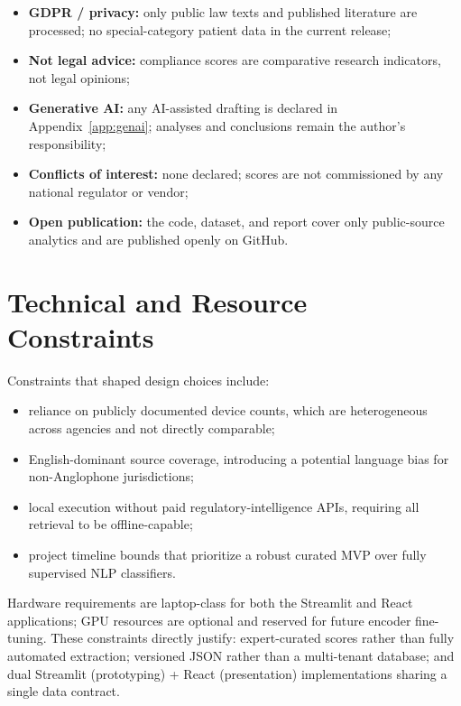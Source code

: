 \begin{itemize}[noitemsep]
  \item \textbf{GDPR / privacy:} only public law texts and published literature are
        processed; no special-category patient data in the current release;
  \item \textbf{Not legal advice:} compliance scores are comparative research
        indicators, not legal opinions;
  \item \textbf{Generative AI:} any AI-assisted drafting is declared in
        Appendix~\ref{app:genai}; analyses and conclusions remain the author's
        responsibility;
  \item \textbf{Conflicts of interest:} none declared; scores are not commissioned
        by any national regulator or vendor;
  \item \textbf{Open publication:} the code, dataset, and report cover only
        public-source analytics and are published openly on GitHub.
\end{itemize}

\section{Technical and Resource Constraints}
\label{sec:constraints}

Constraints that shaped design choices include:

\begin{itemize}[noitemsep]
  \item reliance on publicly documented device counts, which are heterogeneous across
        agencies and not directly comparable;
  \item English-dominant source coverage, introducing a potential language bias for
        non-Anglophone jurisdictions;
  \item local execution without paid regulatory-intelligence APIs, requiring all
        retrieval to be offline-capable;
  \item project timeline bounds that prioritize a robust curated MVP over fully
        supervised NLP classifiers.
\end{itemize}

Hardware requirements are laptop-class for both the Streamlit and React applications;
GPU resources are optional and reserved for future encoder fine-tuning. These
constraints directly justify: expert-curated scores rather than fully automated
extraction; versioned JSON rather than a multi-tenant database; and dual Streamlit
(prototyping) + React (presentation) implementations sharing a single data contract.

